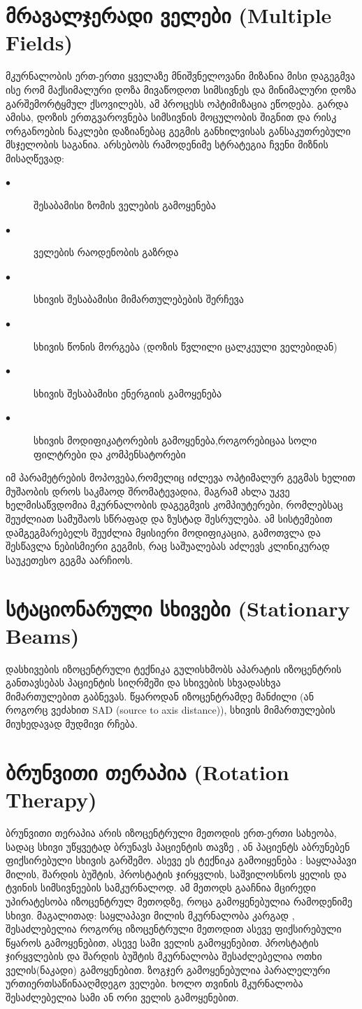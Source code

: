 \documentclass[12pt,a4paper,]{report}
\begin{document}
\section{მრავალჯერადი ველები (Multiple Fields)}
მკურნალობის ერთ-ერთი ყველაზე მნიშვნელოვანი მიზანია მისი დაგეგმვა ისე რომ მაქსიმალური დოზა მივაწოდოთ სიმსივნეს და მინიმალური დოზა გარშემორტყმულ ქსოვილებს, ამ პროცესს ოპტიმიზაცია ეწოდება. გარდა ამისა, დოზის ერთგვაროვნება სიმსივნის მოცულობის შიგნით და რისკ ორგანოების ნაკლები დაზიანებაც გეგმის განხილვისას განსაკუთრებული მსჯელობის საგანია. 
არსებობს რამოდენიმე სტრატეგია ჩვენი მიზნის მისაღწევად:
	\begin{description}
      \item[$\bullet$] შესაბამისი ზომის ველების გამოყენება
      \item[$\bullet$] ველების რაოდენობის გაზრდა
      \item[$\bullet$] სხივის შესაბამისი მიმართულებების შერჩევა
      \item[$\bullet$] სხივის წონის მორგება (დოზის წვლილი ცალკეული ველებიდან)
      \item[$\bullet$] სხივის შესაბამისი ენერგიის გამოყენება
      \item[$\bullet$] სხივის მოდიფიკატორების გამოყენება,როგორებიცაა სოლი ფილტრები და კომპენსატორები
    \end{description}
იმ პარამეტრების მოპოვება,რომელიც იძლევა ოპტიმალურ გეგმას ხელით მუშაობის დროს საკმაოდ შრომატევადია, მაგრამ ახლა უკვე ხელმისაწვდომია მკურნალობის დაგეგმვის კომპიუტერები, რომლებსაც შეუძლიათ სამუშაოს სწრაფად და ზუსტად შესრულება. ამ სისტემებით დამგეგმარებელს შეუძლია მყისიერი მოდიფიკაცია, გამოთვლა და შესწავლა ნებისმიერი გეგმის, რაც საშუალებას აძლევს კლინიკურად საუკეთესო გეგმა აარჩიოს. 

\section{სტაციონარული სხივები (Stationary Beams)}
დასხივების იზოცენტრული ტექნიკა გულისხმობს აპარატის იზოცენტრის განთავსებას პაციენტის სიღრმეში და სხივების სხვადასხვა მიმართულებით გაბნევას. წყაროდან იზოცენტრამდე მანძილი (ან როგორც ვეძახით SAD (source to axis distance)), სხივის მიმართულების მიუხედავად მუდმივი რჩება.

\section{ბრუნვითი თერაპია (Rotation Therapy)}
ბრუნვითი თერაპია არის იზოცენტრული მეთოდის ერთ-ერთი სახეობა, სადაც სხივი უწყვეტად ბრუნავს პაციენტის თავზე , ან პაციენტს აბრუნებენ ფიქსირებული სხივის გარშემო. ასევე ეს ტექნიკა გამოიყენება : საყლაპავი მილის, შარდის ბუშტის, პროსტატის ჯირყვლის, საშვილოსნოს ყელის და ტვინის სიმსივნეების სამკურნალოდ.  ამ მეთოდს გააჩნია მცირედი უპირატესობა იზოცენტრულ მეთოდზე, როცა გამოყენებულია რამოდენიმე სხივი. მაგალითად: საყლაპავი მილის მკურნალობა კარგად , შესაძლებელია როგორც იზოცენტრული მეთოდით ასევე ფიქსირებული წყაროს გამოყენებით, ასევე სამი ველის გამოყენებით.  პროსტატის ჯირყვლების და შარდის ბუშტის მკურნალობა შესაძლებელია ოთხი ველის(ნაკადი) გამოყენებით.  ზოგჯერ გამოყენებულია პარალელური ურთიერთსაწინააღმდეგო ველები. ხოლო თვინის მკურნალობა შესაძლებელია სამი ან ორი ველის გამოყენებით.
\end{document}
